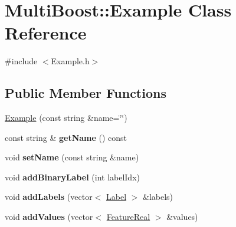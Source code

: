 \hypertarget{classMultiBoost_1_1Example}{\section{Multi\-Boost\-:\-:Example Class Reference}
\label{classMultiBoost_1_1Example}
}


{\ttfamily \#include $<$Example.\-h$>$}

\subsection*{Public Member Functions}
\begin{DoxyCompactItemize}
\item 
\hyperlink{classMultiBoost_1_1Example_a0e8d0e812cba8ff98d56192f106b04a6}{Example} (const string \&name=\char`\"{}\char`\"{})
\item 
\hypertarget{classMultiBoost_1_1Example_af3b54a4e8cd8b46f757cca6a362ebf2e}{const string \& {\bfseries get\-Name} () const }\label{classMultiBoost_1_1Example_af3b54a4e8cd8b46f757cca6a362ebf2e}

\item 
\hypertarget{classMultiBoost_1_1Example_acdf15e60152e0ff0667d673146a98e23}{void {\bfseries set\-Name} (const string \&name)}\label{classMultiBoost_1_1Example_acdf15e60152e0ff0667d673146a98e23}

\item 
\hypertarget{classMultiBoost_1_1Example_a7316d97ab3f93e4a1ab8ff3a26bfdafe}{void {\bfseries add\-Binary\-Label} (int label\-Idx)}\label{classMultiBoost_1_1Example_a7316d97ab3f93e4a1ab8ff3a26bfdafe}

\item 
\hypertarget{classMultiBoost_1_1Example_ac9f701b0fe36eb992e605c26779358bf}{void {\bfseries add\-Labels} (vector$<$ \hyperlink{structMultiBoost_1_1Label}{Label} $>$ \&labels)}\label{classMultiBoost_1_1Example_ac9f701b0fe36eb992e605c26779358bf}

\item 
\hypertarget{classMultiBoost_1_1Example_aa2a66a60ab7ea244690f500cb0ec1f86}{void {\bfseries add\-Values} (vector$<$ \hyperlink{Defaults_8h_a3a11cfe6a5d469d921716ca6291e934f}{Feature\-Real} $>$ \&values)}\label{classMultiBoost_1_1Example_aa2a66a60ab7ea244690f500cb0ec1f86}


\end{DoxyCompactItemize}

